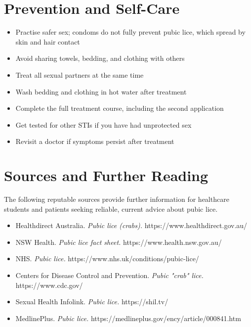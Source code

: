 \section*{Prevention and Self-Care}
\begin{itemize}
    \item Practise safer sex; condoms do not fully prevent pubic lice, which spread by skin and hair contact
    \item Avoid sharing towels, bedding, and clothing with others
    \item Treat all sexual partners at the same time
    \item Wash bedding and clothing in hot water after treatment
    \item Complete the full treatment course, including the second application
    \item Get tested for other STIs if you have had unprotected sex
    \item Revisit a doctor if symptoms persist after treatment
\end{itemize}

\section*{Sources and Further Reading}
The following reputable sources provide further information for healthcare students and patients seeking reliable, current advice about pubic lice.

\begin{itemize}
    \item Healthdirect Australia. \textit{Pubic lice (crabs).} https://www.healthdirect.gov.au/
    \item NSW Health. \textit{Pubic lice fact sheet.} https://www.health.nsw.gov.au/
    \item NHS. \textit{Pubic lice.} https://www.nhs.uk/conditions/pubic-lice/
    \item Centers for Disease Control and Prevention. \textit{Pubic "crab" lice.} https://www.cdc.gov/
    \item Sexual Health Infolink. \textit{Pubic lice.} https://shil.tv/
    \item MedlinePlus. \textit{Pubic lice.} https://medlineplus.gov/ency/article/000841.htm
\end{itemize}
